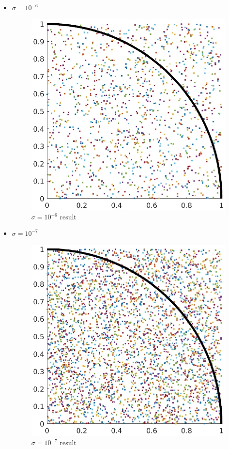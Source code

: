 \begin{itemize}
\begin{figure}[H]
   \end{figure}
    \item $\sigma = 10^{-6}$
    \begin{figure}[H] 
        \caption{$\sigma = 10^{-6}$ result} 
        \centering 
        \includegraphics[width=12cm]{../Figure/Bonus/mont1e-06.eps} 
   \end{figure}
    \item $\sigma = 10^{-7}$
    \begin{figure}[H] 
        \caption{$\sigma = 10^{-7}$ result} 
        \centering 
        \includegraphics[width=12cm]{../Figure/Bonus/mont1e-07.eps} 

\end{figure}
\end{itemize}
